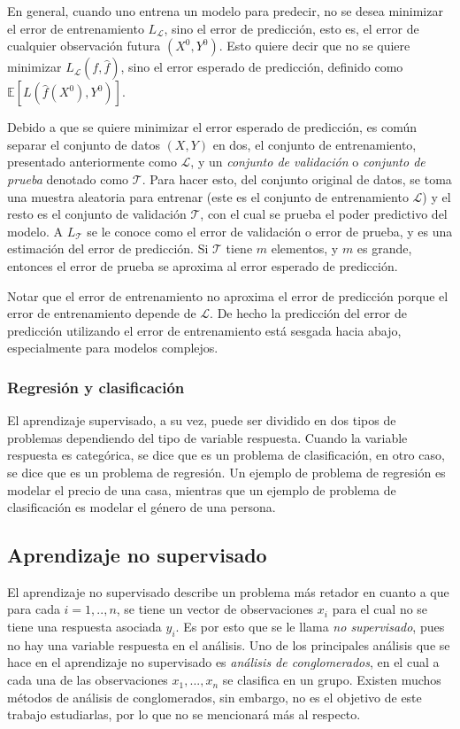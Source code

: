 En general, cuando uno entrena un modelo para predecir, no se desea minimizar el error de entrenamiento $L_{\mathcal{L}}$, sino el error de predicción, esto es, el error de cualquier observación futura $(X^0, Y^0)$. Esto quiere decir que no se quiere minimizar $L_{\mathcal{L}}(f, \hat{f})$, sino el error esperado de predicción, definido como $\mathbb{E} \left[ L(\hat{f}(X^0), Y^0 ) \right] $.

Debido a que se quiere minimizar el error esperado de predicción, es común separar el conjunto de datos $(X, Y)$ en dos, el conjunto de entrenamiento, presentado anteriormente como $\mathcal{L}$, y un \textit{conjunto de validación} o \textit{conjunto de prueba} denotado como $\mathcal{T}$. Para hacer esto, del conjunto original de datos, se toma una muestra aleatoria para entrenar (este es el conjunto de entrenamiento $\mathcal{L}$) y el resto es el conjunto de validación $\mathcal{T}$, con el cual se prueba el poder predictivo del modelo. A $L_{\mathcal{T}}$ se le conoce como el error de validación o error de prueba, y es una estimación del error de predicción. Si $\mathcal{T}$ tiene $m$ elementos, y $m$ es grande, entonces el error de prueba se aproxima al error esperado de predicción.

Notar que el error de entrenamiento no aproxima el error de predicción porque el error de entrenamiento depende de $\mathcal{L}$. De hecho la predicción del error de predicción utilizando el error de entrenamiento está sesgada hacia abajo, especialmente para modelos complejos.

\subsubsection{Regresión y clasificación}

El aprendizaje supervisado, a su vez, puede ser dividido en dos tipos de problemas dependiendo del tipo de variable respuesta. Cuando la variable respuesta es categórica, se dice que es un problema de clasificación, en otro caso, se dice que es un problema de regresión. Un ejemplo de problema de regresión es modelar el precio de una casa, mientras que un ejemplo de problema de clasificación es modelar el género de una persona. 

\subsection{Aprendizaje no supervisado}

El aprendizaje no supervisado describe un problema más retador en cuanto a que para cada $i = 1, .., n$, se tiene un vector de observaciones $x_i$ para el cual no se tiene una respuesta asociada $y_i$. Es por esto que se le llama \textit{no supervisado}, pues no hay una variable respuesta en el análisis. Uno de los principales análisis que se hace en el aprendizaje no supervisado es \textit{análisis de conglomerados}, en el cual a cada una de las observaciones $x_1, ..., x_n$ se clasifica en un grupo. Existen muchos métodos de análisis de conglomerados, sin embargo, no es el objetivo de este trabajo estudiarlas, por lo que no se mencionará más al respecto.


